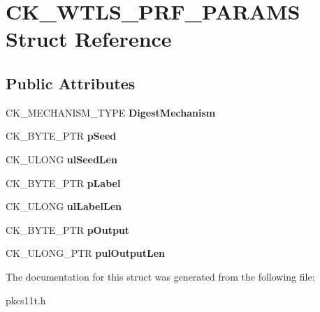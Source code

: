 \hypertarget{struct_c_k___w_t_l_s___p_r_f___p_a_r_a_m_s}{}\section{C\+K\+\_\+\+W\+T\+L\+S\+\_\+\+P\+R\+F\+\_\+\+P\+A\+R\+A\+MS Struct Reference}
\label{struct_c_k___w_t_l_s___p_r_f___p_a_r_a_m_s}
\subsection*{Public Attributes}
\begin{DoxyCompactItemize}
\item 
\mbox{\label{struct_c_k___w_t_l_s___p_r_f___p_a_r_a_m_s_ac6436a02ffb4456ded679269d39d1ff5}} 
C\+K\+\_\+\+M\+E\+C\+H\+A\+N\+I\+S\+M\+\_\+\+T\+Y\+PE {\bfseries Digest\+Mechanism}
\item 
\mbox{\label{struct_c_k___w_t_l_s___p_r_f___p_a_r_a_m_s_a0c3ad364b33803b03e19e5dfdedf3ee5}} 
C\+K\+\_\+\+B\+Y\+T\+E\+\_\+\+P\+TR {\bfseries p\+Seed}
\item 
\mbox{\label{struct_c_k___w_t_l_s___p_r_f___p_a_r_a_m_s_a7d8b97f28c8b840279020456f79dd417}} 
C\+K\+\_\+\+U\+L\+O\+NG {\bfseries ul\+Seed\+Len}
\item 
\mbox{\label{struct_c_k___w_t_l_s___p_r_f___p_a_r_a_m_s_a19db3dcedca6d94414ae8129dcc4d9aa}} 
C\+K\+\_\+\+B\+Y\+T\+E\+\_\+\+P\+TR {\bfseries p\+Label}
\item 
\mbox{\label{struct_c_k___w_t_l_s___p_r_f___p_a_r_a_m_s_a28b6aa5bf2481a161c0da65b03172c65}} 
C\+K\+\_\+\+U\+L\+O\+NG {\bfseries ul\+Label\+Len}
\item 
\mbox{\label{struct_c_k___w_t_l_s___p_r_f___p_a_r_a_m_s_aca999ea8711746cc82ef707e471e692c}} 
C\+K\+\_\+\+B\+Y\+T\+E\+\_\+\+P\+TR {\bfseries p\+Output}
\item 
\mbox{\label{struct_c_k___w_t_l_s___p_r_f___p_a_r_a_m_s_a677fffe2c77dacb51f64e277258a335d}} 
C\+K\+\_\+\+U\+L\+O\+N\+G\+\_\+\+P\+TR {\bfseries pul\+Output\+Len}
\end{DoxyCompactItemize}


The documentation for this struct was generated from the following file\+:\begin{DoxyCompactItemize}
\item 
pkcs11t.\+h\end{DoxyCompactItemize}
